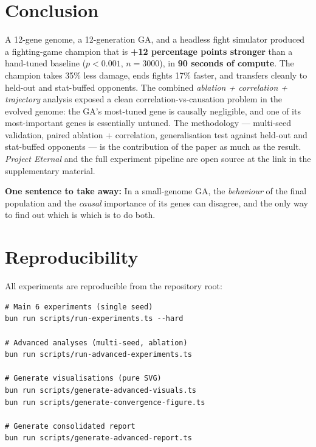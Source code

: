 \documentclass[conference]{IEEEtran}
\begin{document}
\section{Conclusion}
\label{sec:conclusion}

A 12-gene genome, a 12-generation GA, and a headless fight simulator produced a fighting-game champion that is \textbf{+12 percentage points stronger} than a hand-tuned baseline ($p < 0.001$, $n = 3000$), in \textbf{90 seconds of compute}. The champion takes 35\% less damage, ends fights 17\% faster, and transfers cleanly to held-out and stat-buffed opponents. The combined \emph{ablation + correlation + trajectory} analysis exposed a clean correlation-vs-causation problem in the evolved genome: the GA's most-tuned gene is causally negligible, and one of its most-important genes is essentially untuned. The methodology --- multi-seed validation, paired ablation + correlation, generalisation test against held-out and stat-buffed opponents --- is the contribution of the paper as much as the result. \emph{Project Eternal} and the full experiment pipeline are open source at the link in the supplementary material.

\begin{center}
\textbf{One sentence to take away:} In a small-genome GA, the \emph{behaviour} of the final population and the \emph{causal} importance of its genes can disagree, and the only way to find out which is which is to do both.
\end{center}


\appendix

\section{Reproducibility}

All experiments are reproducible from the repository root:

\begin{small}
\begin{verbatim}
# Main 6 experiments (single seed)
bun run scripts/run-experiments.ts --hard

# Advanced analyses (multi-seed, ablation)
bun run scripts/run-advanced-experiments.ts

# Generate visualisations (pure SVG)
bun run scripts/generate-advanced-visuals.ts
bun run scripts/generate-convergence-figure.ts

# Generate consolidated report
bun run scripts/generate-advanced-report.ts
\end{verbatim}
\end{small}
\end{document}
